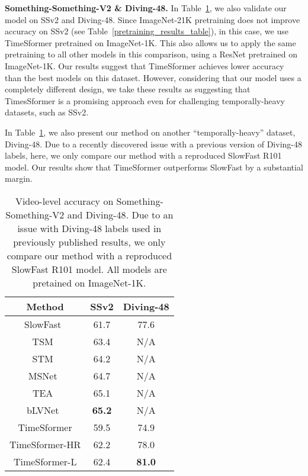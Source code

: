 \documentclass{article}
\begin{document}
\textbf{Something-Something-V2 \& Diving-48.} In Table~\ref{ssv2_results_table}, we also validate our model on SSv2 and Diving-48. Since ImageNet-21K pretraining does not improve accuracy on SSv2 (see Table~\ref{pretraining_results_table}), in this case, we use TimeSformer pretrained on ImageNet-1K. This also allows us to apply the same pretraining to all other models in this comparison, using a ResNet pretrained on ImageNet-1K. Our results suggest that TimeSformer achieves lower accuracy than the best models on this dataset. However, considering that our model uses a completely different design, we take these results as suggesting that TimesSformer is a promising approach even for challenging temporally-heavy datasets, such as SSv2. 

In Table~\ref{ssv2_results_table}, we also present our method on another ``temporally-heavy'' dataset, Diving-48. Due to a recently discovered issue with a previous version of Diving-48 labels, here, we only compare our method with a reproduced SlowFast  R101 model. Our results show that TimeSformer outperforms SlowFast by a substantial margin.






 
 
\begin{table}
\centering
{\scriptsize
 \begin{tabular}{c c c }
 \hline
{Method} & {SSv2} & {Diving-48\boldmath{}} \\ 
 \hline
SlowFast~\cite{slowfast} & 61.7 & 77.6 \\
TSM~\cite{lin2019tsm} & 63.4 & N/A \\
STM~\cite{Jiang_2019_ICCV}  & 64.2 & N/A \\
MSNet~\cite{kwon2020motionsqueeze} & 64.7 & N/A \\
TEA~\cite{Li_2020_CVPR} & 65.1 & N/A \\
bLVNet~\cite{NEURIPS2019_3d779cae} & \bf 65.2 & N/A \\
\hline
TimeSformer & 59.5  & 74.9 \\
TimeSformer-HR & 62.2  & 78.0 \\
TimeSformer-L & 62.4 & \bf 81.0\\
 \hline
 \end{tabular}
 }
\vspace{-0.1cm}
\caption{{Video-level accuracy on Something-Something-V2 and Diving-48}. \boldmath{}Due to an issue with Diving-48 labels used in previously published results, we only compare our method with a reproduced SlowFast  R101 model. All models are pretained on ImageNet-1K.\vspace{-0.3cm}}\label{ssv2_results_table}
 \end{table}
\end{document}
